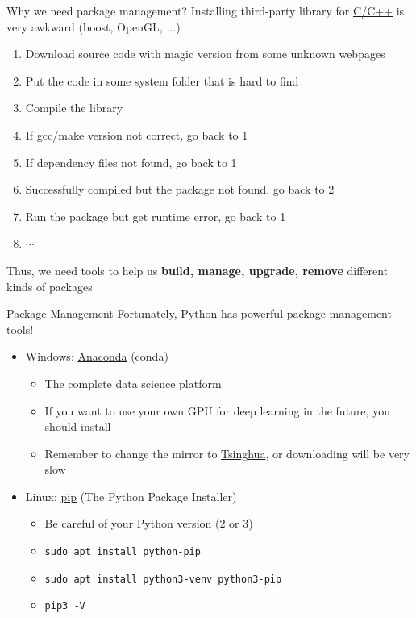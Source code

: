 \documentclass{../TexTemplate/myslide}
\begin{document}
\begin{frame}{Why we need package management?}
Installing third-party library for \underline{C/C++} is very awkward (boost, OpenGL, $\ldots$)
\begin{enumerate}[<+->]
	\item Download source code with magic version from some unknown webpages
	\item Put the code in some system folder that is hard to find
	\item Compile the library
	\item If gcc/make version not correct, go back to 1
	\item If dependency files not found, go back to 1
	\item Successfully compiled but the package not found, go back to 2
	\item Run the package but get runtime error, go back to 1
	\item $\cdots$
\end{enumerate}
\pause
Thus, we need tools to help us \textbf{build, manage, upgrade, remove} different kinds of packages
\end{frame}

\begin{frame}[fragile]{Package Management}
Fortunately, \underline{Python} has powerful package management tools!
\begin{itemize}
	\item Windows: \href{https://www.anaconda.com/}{Anaconda} (conda)
	\begin{itemize}
		\item The complete data science platform
		\item If you want to use your own GPU for deep learning in the future, you should install
		\item Remember to change the mirror to \href{https://mirror.tuna.tsinghua.edu.cn/help/anaconda/}{Tsinghua}, or downloading will be very slow
	\end{itemize}
	\item Linux: \href{https://pip.pypa.io/en/stable/}{pip} (The Python Package Installer)
	\begin{itemize}
		\item Be careful of your Python version (2 or 3)
		\item \verb'sudo apt install python-pip'
		\item \verb'sudo apt install python3-venv python3-pip'
		\item \verb'pip3 -V'
	\end{itemize}
\end{itemize}
\end{frame}
\end{document}
